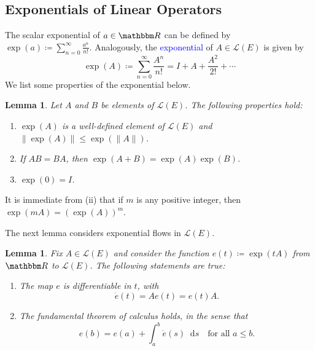 \documentclass[12pt, reqno]{amsart}
\renewcommand{\leq}{\leqslant}
\newcommand{\1}{\mathbbm 1}
\newcommand*\diff{\mathop{}\!\mathrm{d}}
\newcommand{\lL}{\mathcal L}
\newcommand{\RR}{\mathbbm R}
\theoremstyle{plain}
\newtheorem{lemma}[theorem]{Lemma}
\theoremstyle{definition}
\newcommand{\navy}[1]{\textcolor{blue}{#1}}
\begin{document}
\subsection{Exponentials of Linear Operators}

The scalar exponential of $a \in \RR$ can be defined by $\exp(a)
\coloneq \sum_{n=0}^\infty \frac{a^n}{n!}$.  Analogously, the \navy{exponential}
of $A \in \lL(E)$ is given by
%
\begin{equation}\label{eq:expfun} 
    \exp(A) 
    \coloneq \sum_{n=0}^\infty \frac{A^n}{n!}
    = I + A + \frac{A^2}{2!} + \cdots
\end{equation}
%
We list some properties of the exponential below.

\begin{lemma}\label{l:expcom}
    Let $A$ and $B$ be elements of $\lL(E)$.  The following properties hold:
    \begin{enumerate}
        \item $\exp(A)$ is a well-defined element of $\lL(E)$  and $\| \exp(A) \| \leq \exp(\|A\|)$.
        \item If $AB = BA$, then $\exp(A + B) =
            \exp(A) \exp(B)$.
        \item $\exp(0) = I$.
    \end{enumerate}
\end{lemma}

It is immediate from (ii) that if $m$ is any positive integer, then $\exp(mA) =
(\exp(A))^m$.

The next lemma considers exponential flows in $\lL(E)$.

\begin{lemma}\label{l:expcom2}
    Fix $A \in \lL(E)$ and consider the function $e(t) \coloneq \exp(tA)$ from
    $\RR$ to $\lL(E)$.  The following statements are true:
    \begin{enumerate}
        \item The map $e$ is differentiable in $t$, with
            \begin{equation}\label{eq:matdiffl}
                \dot e(t) = A e(t) = e(t) A.
            \end{equation}
        \item The fundamental theorem of calculus holds, in the sense that
            \begin{equation}\label{eq:ftcexp}
                e(b) 
                 = e(a) + \int_a^b \dot e(s) \diff s \quad \text{for all } a \leq b.
            \end{equation}
    \end{enumerate}
\end{lemma}
\end{document}
